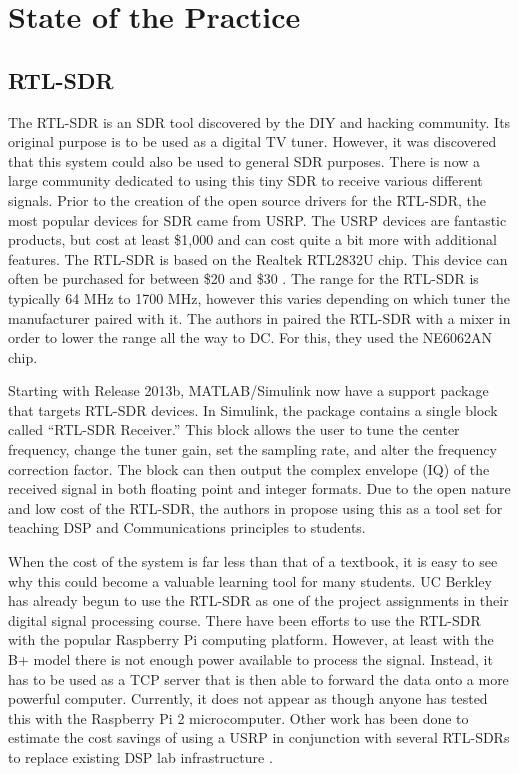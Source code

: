 
\section{State of the Practice}

\subsection{RTL-SDR}

	The RTL-SDR is an SDR tool discovered by the DIY and hacking community. Its original purpose is to be used as a digital TV tuner. However, it was discovered that this system could also be used to general SDR purposes. There is now a large community dedicated to using this tiny SDR to receive various different signals. Prior to the creation of the open source drivers for the RTL-SDR, the most popular devices for SDR came from USRP. The USRP devices are fantastic products, but cost at least \$1,000 and can cost quite a bit more with additional features. The RTL-SDR is based on the Realtek RTL2832U chip. This device can often be purchased for between \$20 and \$30 \cite{6526525}. The range for the RTL-SDR is typically 64 MHz	to 1700 MHz, however this varies depending on which tuner the manufacturer paired with it. The authors in \cite{6526525} paired the RTL-SDR with a mixer in order to lower the range all the way to DC. For this, they used the NE6062AN chip.  
	
	Starting with Release 2013b, MATLAB/Simulink now have a support package that targets RTL-SDR devices. In Simulink, the package contains a single block called ``RTL-SDR Receiver.'' This block allows the user to tune the center frequency, change the tuner gain, set the sampling rate, and alter the frequency correction factor. The block can then output the complex envelope (IQ) of the received signal in both floating point and integer formats\cite{6893337}.  Due to the open nature and low cost of the RTL-SDR, the authors in \cite{6821718} propose using this as a tool set for teaching DSP and Communications principles to students. 
	
	When the cost of the system is far less than that of a
	textbook, it is easy to see why this could become a valuable learning tool for many students. UC Berkley has already begun to use the RTL-SDR as one of the project assignments in their digital signal processing course. 	There have been efforts to use the RTL-SDR with the popular Raspberry Pi computing platform. However, at least with the B+ model there is not enough power available to process the signal. Instead, it has to be used as a TCP server that is then able to forward the data onto a more powerful computer\cite{6938691}. Currently, it does not appear as though anyone has tested this with the Raspberry Pi 2 microcomputer. Other work has been done to estimate the cost savings of using a USRP in conjunction with several RTL-SDRs to replace existing DSP lab infrastructure \cite{6726630}. 
	
